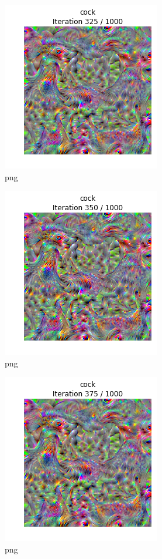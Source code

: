 \documentclass[]{book}
\theoremstyle{definition}
\theoremstyle{definition}
\theoremstyle{definition}
\theoremstyle{remark}
\begin{document}
\begin{figure}
\centering
\includegraphics{Network-Visualization-TensorFlow_files/Network-Visualization-TensorFlow_22_13.png}
\caption{png}
\end{figure}

\begin{figure}
\centering
\includegraphics{Network-Visualization-TensorFlow_files/Network-Visualization-TensorFlow_22_14.png}
\caption{png}
\end{figure}

\begin{figure}
\centering
\includegraphics{Network-Visualization-TensorFlow_files/Network-Visualization-TensorFlow_22_15.png}
\caption{png}
\end{figure}
\end{document}
